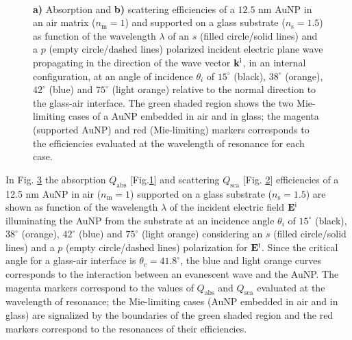 \begin{figure}[b!]
    \def\svgwidth{.95\textwidth}
    \centering
    \hspace*{-28.5em}%
    \vspace*{-1.25em}%
        \begin{subfigure}{.71\textwidth}\caption{ }\label{sfig:SuppObl:Eff:Abs}\end{subfigure}%
        \begin{subfigure}{.25\textwidth}\caption{ }\label{sfig:SuppObl:Eff:Sca}\end{subfigure} \\
    \vspace*{-.5em}
    \caption[Absorption and Scattering Efficiencies of a 12.5 nm AuNP on a Interface Illuminated in an internal configuration at oblique incidence]{\textbf{a)} Absorption and \textbf{b)} scattering efficiencies of a $12.5$ nm AuNP in an air matrix ($n_\text{m} = 1$) and supported on a glass substrate ($n_\text{s} = 1.5$) as function of the wavelength $\lambda$ of an  $s$ (filled circle/solid lines) and a $p$ (empty circle/dashed lines) polarized incident electric plane wave propagating in the direction of the wave vector $\vb{k}^\text{i}$, in an internal configuration, at an angle of incidence $\theta_i$ of $15^\circ$ (black),  $38^\circ$ (orange),  $42^\circ$ (blue) and  $75^\circ$ (light orange) relative to the normal direction to the glass-air interface. The green shaded region shows the two Mie-limiting cases of a AuNP embedded in air and in glass; the magenta (supported AuNP) and red (Mie-limiting) markers corresponds to the efficiencies evaluated at the wavelength of resonance for each case.}
\label{fig:SuppObl:Eff}
\end{figure}

In Fig. \ref{fig:SuppObl:Eff} the absorption $Q_\text{abs}$ [Fig.\ref{sfig:SuppObl:Eff:Abs}] and scattering $Q_\text{sca}$ [Fig. \ref{sfig:SuppObl:Eff:Sca}] efficiencies of a 12.5 nm AuNP in air ($n_\text{m} = 1$) supported on a glass substrate ($n_\text{s} = 1.5$) are shown as function of the wavelength $\lambda$ of the incident electric field $\vb{E}^\text{i}$ illuminating the AuNP from the substrate at an incidence angle $\theta_i$ of $15^\circ$ (black),  $38^\circ$ (orange),   $42^\circ$ (blue) and  $75^\circ$ (light orange) considering an $s$ (filled circle/solid lines) and a $p$ (empty circle/dashed lines) polarization for $\vb{E}^\text{i}$. Since the critical angle for a glass-air interface is $\theta_c = 41.8^\circ$, the blue and light orange curves corresponds to the interaction between an evanescent wave and the AuNP. The magenta markers correspond to the values of $Q_\text{abs}$ and $Q_\text{sca}$ evaluated at the wavelength of resonance; the Mie-limiting cases (AuNP embedded in air and in glass)  are signalized by the boundaries of the green shaded region  and the red markers correspond to the resonances of their efficiencies.

